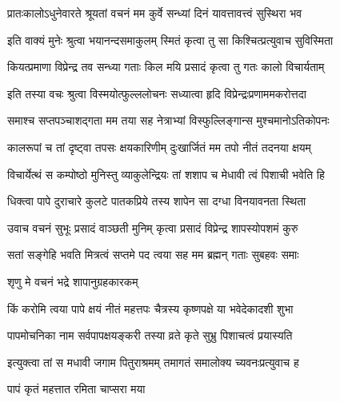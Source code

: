 
\twolineshloka
{प्रातःकालोऽधुनेवारते श्रूयतां वचनं मम}
{कुर्वे सन्ध्यां दिनं यावत्तावत्त्वं सुस्थिरा भव} %

\twolineshloka
{इति वाक्यं मुनेः श्रुत्वा भयानन्दसमाकुलम्}
{स्मितं कृत्वा तु सा किश्चित्प्रत्युवाच सुविस्मिता} %


\twolineshloka
{कियत्प्रमाणा विप्रेन्द्र तव सन्ध्या गताः किल}
{मयि प्रसादं कृत्वा तु गतः कालो विचार्यताम्} %

\twolineshloka
{इति तस्या वचः श्रुत्वा विस्मयोत्फुल्ललोचनः}
{सध्यात्वा हृदि विप्रेन्द्रःप्रणाममकरोत्तदा} %

\twolineshloka
{समाश्च सप्तपञ्चाशद्गता मम तया सह}
{नेत्राभ्यां विस्फुल्लिङ्गान्स मुश्चमानोऽतिकोपनः} %

\twolineshloka
{कालरूपां च तां दृष्ट्वा तपसः क्षयकारिणीम्}
{दुःखार्जितं मम तपो नीतं तदनया क्षयम्} %

\twolineshloka
{विचार्येत्थं स कम्पोष्ठो मुनिस्तु व्याकुलेन्द्रियः}
{तां शशाप च मेधावी त्वं पिशाची भवेति हि} %

\twolineshloka
{धिक्त्वा पापे दुराचारे कुलटे पातकप्रिये}
{तस्य शापेन सा दग्धा विनयावनता स्थिता} %

\twolineshloka
{उवाच वचनं सुभूः प्रसादं वाञ्छती मुनिम्}
{कृत्वा प्रसादं विप्रेन्द्र शापस्योपशमं कुरु} %

\twolineshloka
{सतां सङ्गेहि भवति मित्रत्वं सप्तमे पद}
{त्वया सह मम ब्रह्मन् गताः सुबहवः समाः} %



\onelineshloka
{शृणु मे वचनं भद्रे शापानुग्रहकारकम्} %

\twolineshloka
{किं करोमि त्वया पापे क्षयं नीतं महत्तपः}
{चैत्रस्य कृष्णपक्षे या भवेदेकादशी शुभा} %

\twolineshloka
{पापमोचनिका नाम सर्वपापक्षयङ्करी}
{तस्या व्रते कृते सुभ्रु पिशाचत्वं प्रयास्यति} %

\twolineshloka
{इत्युक्त्वा तां स मधावी जगाम पितुराश्रमम्}
{तमागतं समालोक्य च्यवनःप्रत्युवाच ह} %



\onelineshloka
{पापं कृतं महत्तात रमिता चाप्सरा मया} %


